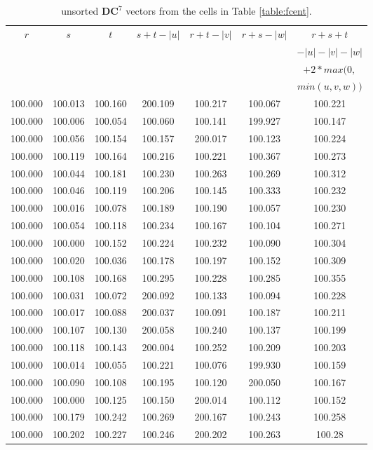 \documentclass[preprint]{iucr}              %
\begin{document}
{\begin{table}
	\caption{unsorted $\mathbf{DC}^7$ vectors from the cells in Table \ref{table:fcent}.}
	\label{table::fcentdc7}
	\begin{tabular}{c c c c c c c}
		$r$&$s$&$t$&$s+t-|u|$&$r+t-|v|$&$r+s-|w|$&$r+s+t$\\
		&&&&&&$-|u|-|v|-|w|$\\
		&&&&&&$+2*max(0,$\\
		&&&&&&$min(u,v,w))$\\
                100.000&  100.013&  100.160&  200.109&  100.217&  100.067&  100.221\\
                100.000&  100.006&  100.054&  100.060&  100.141&  199.927&  100.147\\
                100.000&  100.056&  100.154&  100.157&  200.017&  100.123&  100.224\\
                100.000&  100.119&  100.164&  100.216&  100.221&  100.367&  100.273\\
                100.000&  100.044&  100.181&  100.230&  100.263&  100.269&  100.312\\
                100.000&  100.046&  100.119&  100.206&  100.145&  100.333&  100.232\\
                100.000&  100.016&  100.078&  100.189&  100.190&  100.057&  100.230\\
                100.000&  100.054&  100.118&  100.234&  100.167&  100.104&  100.271\\
                100.000&  100.000&  100.152&  100.224&  100.232&  100.090&  100.304\\
                100.000&  100.020&  100.036&  100.178&  100.197&  100.152&  100.309\\
                100.000&  100.108&  100.168&  100.295&  100.228&  100.285&  100.355\\
                100.000&  100.031&  100.072&  200.092&  100.133&  100.094&  100.228\\
                100.000&  100.017&  100.088&  200.037&  100.091&  100.187&  100.211\\
                100.000&  100.107&  100.130&  200.058&  100.240&  100.137&  100.199\\
                100.000&  100.118&  100.143&  200.004&  100.252&  100.209&  100.203\\
                100.000&  100.014&  100.055&  100.221&  100.076&  199.930&  100.159\\
                100.000&  100.090&  100.108&  100.195&  100.120&  200.050&  100.167\\
                100.000&  100.000&  100.125&  100.150&  200.014&  100.112&  100.152\\
                100.000&  100.179&  100.242&  100.269&  200.167&  100.243&  100.258\\
                100.000&  100.202&  100.227&  100.246&  200.202&  100.263&  100.28\\
\end{tabular}
\end{table}



}
\end{document}
